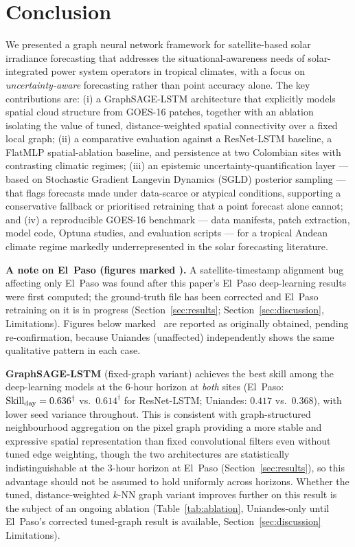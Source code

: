 \section{Conclusion}
\label{sec:conclusion}

We presented a graph neural network framework for satellite-based solar
irradiance forecasting that addresses the situational-awareness needs of
solar-integrated power system operators in tropical climates, with a focus on
\emph{uncertainty-aware} forecasting rather than point accuracy
alone. The key contributions are: (i) a GraphSAGE-LSTM architecture that
explicitly models spatial cloud structure from GOES-16 patches, together with
an ablation isolating the value of tuned, distance-weighted spatial
connectivity over a fixed local graph; (ii) a comparative evaluation
against a ResNet-LSTM baseline, a FlatMLP spatial-ablation baseline, and
persistence at two Colombian sites with contrasting climatic regimes; (iii)
an epistemic uncertainty-quantification layer --- based on Stochastic
Gradient Langevin Dynamics (SGLD) posterior sampling --- that flags
forecasts made under data-scarce or atypical conditions, supporting a
conservative fallback or prioritised retraining that a point forecast alone
cannot; and (iv) a reproducible GOES-16 benchmark --- data manifests, patch
extraction, model code, Optuna studies, and evaluation scripts --- for a
tropical Andean climate regime markedly underrepresented in the solar
forecasting literature.

\textbf{A note on El~Paso (figures marked \dag).} A satellite-timestamp
alignment bug affecting only El~Paso was found after this paper's El~Paso
deep-learning results were first computed; the ground-truth file has been
corrected and El~Paso retraining on it is in progress
(Section~\ref{sec:results}; Section~\ref{sec:discussion}, Limitations).
Figures below marked \dag\ are reported as originally obtained, pending
re-confirmation, because Uniandes (unaffected) independently shows the
same qualitative pattern in each case.

\textbf{GraphSAGE-LSTM} (fixed-graph variant) achieves the best skill among
the deep-learning models at the 6-hour horizon at \emph{both} sites (El~Paso:
$\text{Skill}_\text{day} = 0.636^\dagger$ vs.\ $0.614^\dagger$ for ResNet-LSTM; Uniandes: $0.417$ vs.\
$0.368$), with lower seed variance throughout. This is consistent with
graph-structured neighbourhood aggregation on the pixel graph providing a
more stable and expressive spatial representation than fixed convolutional
filters even without tuned edge weighting, though the two architectures are
statistically indistinguishable at the 3-hour horizon at El~Paso
(Section~\ref{sec:results}), so this advantage should not be assumed to hold
uniformly across horizons. Whether the tuned, distance-weighted $k$-NN
graph variant improves further on this result is the subject of an ongoing
ablation (Table~\ref{tab:ablation}, Uniandes-only until El~Paso's corrected
tuned-graph result is available, Section~\ref{sec:discussion} Limitations).

